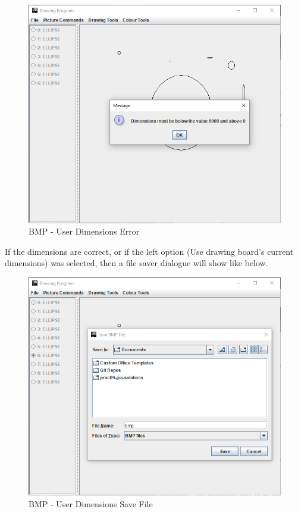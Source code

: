 \documentclass[12pt]{article} %
\begin{document}
\begin{figure}[H]
\caption{BMP - User Dimensions Error}
\centering
\includegraphics[scale=0.75]{pictures/bmpThirdWindow.PNG}
\end{figure}

If the dimensions are correct, or if the left option (Use drawing board's current dimensions) was selected, then a file saver dialogue will show like below.

\begin{figure}[H]
\caption{BMP - User Dimensions Save File}
\centering
\includegraphics[scale=0.75]{pictures/bmpFourthWindow.PNG}
\end{figure}
\end{document}

